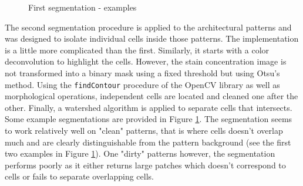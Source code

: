 \begin{figure}
	\center
	\caption{First segmentation - examples}
	\label{fig:first_seg_examples}
\end{figure}

The second segmentation procedure is applied to the architectural patterns and was designed to isolate individual cells inside those patterns. The implementation is a little more complicated than the first. Similarly, it starts with a color deconvolution to highlight the cells. However, the stain concentration image is not transformed into a binary mask using a fixed threshold but using Otsu's method. Using the \texttt{findContour} procedure of the OpenCV library as well as morphological operations, independent cells are located and cleaned one after the other. Finally, a watershed algorithm is applied to separate cells that intersects. Some example segmentations are provided in Figure \ref{fig:first_seg_examples}. The segmentation seems to work relatively well on "clean" patterns, that is where cells doesn't overlap much and are clearly distinguishable from the pattern background (see the first two examples in Figure \ref{fig:first_seg_examples}). One "dirty" patterns however, the segmentation performs poorly as it either returns large patches which doesn't correspond to cells or fails to separate overlapping cells.  

